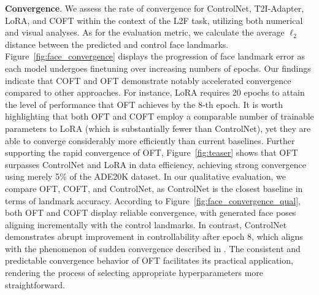 \textbf{Convergence}. We assess the rate of convergence for ControlNet, T2I-Adapter, LoRA, and COFT within the context of the L2F task, utilizing both numerical and visual analyses. As for the evaluation metric, we calculate the average $\ell_2$ distance between the predicted and control face landmarks. Figure~\ref{fig:face_convergence} displays the progression of face landmark error as each model undergoes finetuning over increasing numbers of epochs. Our findings indicate that COFT and OFT demonstrate notably accelerated convergence compared to other approaches. For instance, LoRA requires 20 epochs to attain the level of performance that OFT achieves by the 8-th epoch. It is worth highlighting that both OFT and COFT employ a comparable number of trainable parameters to LoRA (which is substantially fewer than ControlNet), yet they are able to converge considerably more efficiently than current baselines. Further supporting the rapid convergence of OFT, Figure~\ref{fig:teaser} shows that OFT surpasses ControlNet and LoRA in data efficiency, achieving strong convergence using merely 5\% of the ADE20K dataset. In our qualitative evaluation, we compare OFT, COFT, and ControlNet, as ControlNet is the closest baseline in terms of landmark accuracy. According to Figure~\ref{fig:face_convergence_qual}, both OFT and COFT display reliable convergence, with generated face poses aligning incrementally with the control landmarks. In contrast, ControlNet demonstrates abrupt improvement in controllability after epoch 8, which aligns with the phenomenon of sudden convergence described in \cite{zhang2023adding}. The consistent and predictable convergence behavior of OFT facilitates its practical application, rendering the process of selecting appropriate hyperparameters more straightforward.

